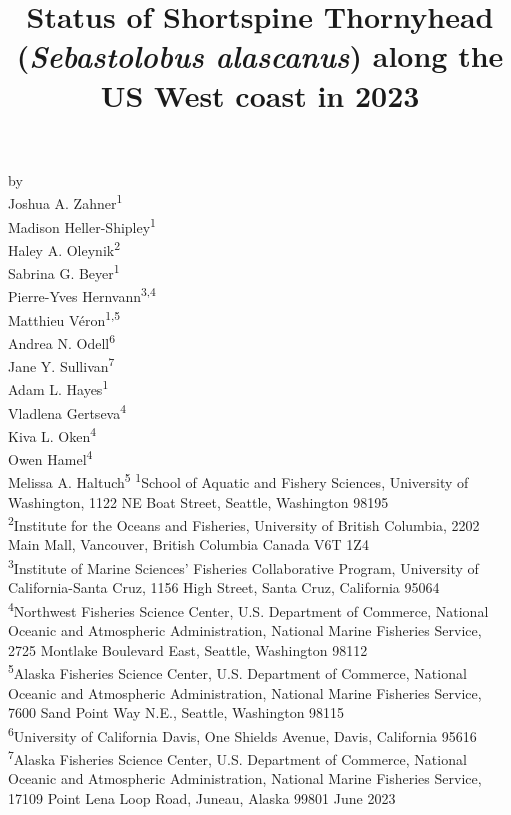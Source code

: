 \documentclass[11pt,
  english,
  letterpaper,
]{article}
\date{}
\newcommand{\trTitle}{Status of Shortspine Thornyhead (\emph{Sebastolobus alascanus}) along the US West coast in 2023}
\newcommand{\trYear}{2023}
\newcommand{\trMonth}{June}
\newcommand\includegraphicsifexists[2][width=\linewidth]{\IfFileExists{#2}{\texttt{[image: \#2]}}{}}
\begin{document}

\renewcommand*{\thefootnote}{\fnsymbol{footnote}}

\small
\thispagestyle{empty}
\noindent
\begin{center}
\title{Status of Shortspine Thornyhead (\emph{Sebastolobus alascanus}) along the US West coast in 2023}
\vspace{1.5cm}
{\Large\textbf{}}

\includegraphicsifexists[width=4in]{figure_title.png}
\vfill
by\\
Joshua A. Zahner\textsuperscript{1}\\
Madison Heller-Shipley\textsuperscript{1}\\
Haley A. Oleynik\textsuperscript{2}\\
Sabrina G. Beyer\textsuperscript{1}\\
Pierre-Yves Hernvann\textsuperscript{3,4}\\
Matthieu Véron\textsuperscript{1,5}\\
Andrea N. Odell\textsuperscript{6}\\
Jane Y. Sullivan\textsuperscript{7}\\
Adam L. Hayes\textsuperscript{1}\\
Vladlena Gertseva\textsuperscript{4}\\
Kiva L. Oken\textsuperscript{4}\\
Owen Hamel\textsuperscript{4}\\
Melissa A. Haltuch\textsuperscript{5}\vfill
\textsuperscript{1}School of Aquatic and Fishery Sciences, University of Washington, 1122 NE Boat Street, Seattle, Washington 98195\\
\textsuperscript{2}Institute for the Oceans and Fisheries, University of British Columbia, 2202 Main Mall, Vancouver, British Columbia Canada V6T 1Z4\\
\textsuperscript{3}Institute of Marine Sciences' Fisheries Collaborative Program, University of California-Santa Cruz, 1156 High Street, Santa Cruz, California 95064\\
\textsuperscript{4}Northwest Fisheries Science Center, U.S. Department of Commerce, National Oceanic and Atmospheric Administration, National Marine Fisheries Service, 2725 Montlake Boulevard East, Seattle, Washington 98112\\
\textsuperscript{5}Alaska Fisheries Science Center, U.S. Department of Commerce, National Oceanic and Atmospheric Administration, National Marine Fisheries Service, 7600 Sand Point Way N.E., Seattle, Washington 98115\\
\textsuperscript{6}University of California Davis, One Shields Avenue, Davis, California 95616\\
\textsuperscript{7}Alaska Fisheries Science Center, U.S. Department of Commerce, National Oceanic and Atmospheric Administration, National Marine Fisheries Service, 17109 Point Lena Loop Road, Juneau, Alaska 99801\vfill
\trMonth{} \trYear{}
\end{center}
\clearpage
\end{document}

